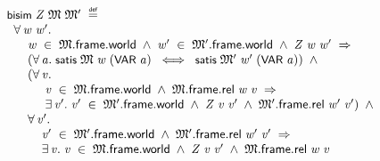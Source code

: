 \documentclass[letterpaper]{article}
\renewcommand{\HOLConst}[1]{{\textsf{\upshape\small #1}}}
\newenvironment{holmath}{\begin{displaymath}\begin{array}{l}}{\end{array}\end{displaymath}\ignorespacesafterend}
\begin{document}
\begin{holmath}
  \HOLConst{bisim}\;\HOLFreeVar{Z}\;\HOLFreeVar{\ensuremath{\mathfrak{M}}}\;\HOLFreeVar{\ensuremath{\mathfrak{M}'}}\;\HOLSymConst{\HOLTokenDefEquality{}}\\
\;\;\HOLSymConst{\HOLTokenForall{}}\HOLBoundVar{w}\;\HOLBoundVar{w\sp{\prime}}.\\
\;\;\;\;\;\;\HOLBoundVar{w}\;\HOLSymConst{\HOLTokenIn{}}\;\HOLFreeVar{\ensuremath{\mathfrak{M}}}.\HOLFieldName{frame}.\HOLFieldName{world}\;\HOLSymConst{\HOLTokenConj{}}\;\HOLBoundVar{w\sp{\prime}}\;\HOLSymConst{\HOLTokenIn{}}\;\HOLFreeVar{\ensuremath{\mathfrak{M}'}}.\HOLFieldName{frame}.\HOLFieldName{world}\;\HOLSymConst{\HOLTokenConj{}}\;\HOLFreeVar{Z}\;\HOLBoundVar{w}\;\HOLBoundVar{w\sp{\prime}}\;\HOLSymConst{\HOLTokenImp{}}\\
\;\;\;\;\;\;(\HOLSymConst{\HOLTokenForall{}}\HOLBoundVar{a}.\;\HOLConst{satis}\;\HOLFreeVar{\ensuremath{\mathfrak{M}}}\;\HOLBoundVar{w}\;(\HOLConst{VAR}\;\HOLBoundVar{a})\;\HOLSymConst{\HOLTokenEquiv{}}\;\HOLConst{satis}\;\HOLFreeVar{\ensuremath{\mathfrak{M}'}}\;\HOLBoundVar{w\sp{\prime}}\;(\HOLConst{VAR}\;\HOLBoundVar{a}))\;\HOLSymConst{\HOLTokenConj{}}\\
\;\;\;\;\;\;(\HOLSymConst{\HOLTokenForall{}}\HOLBoundVar{v}.\\
\;\;\;\;\;\;\;\;\;\;\;\HOLBoundVar{v}\;\HOLSymConst{\HOLTokenIn{}}\;\HOLFreeVar{\ensuremath{\mathfrak{M}}}.\HOLFieldName{frame}.\HOLFieldName{world}\;\HOLSymConst{\HOLTokenConj{}}\;\HOLFreeVar{\ensuremath{\mathfrak{M}}}.\HOLFieldName{frame}.\HOLFieldName{rel}\;\HOLBoundVar{w}\;\HOLBoundVar{v}\;\HOLSymConst{\HOLTokenImp{}}\\
\;\;\;\;\;\;\;\;\;\;\;\HOLSymConst{\HOLTokenExists{}}\HOLBoundVar{v\sp{\prime}}.\;\HOLBoundVar{v\sp{\prime}}\;\HOLSymConst{\HOLTokenIn{}}\;\HOLFreeVar{\ensuremath{\mathfrak{M}'}}.\HOLFieldName{frame}.\HOLFieldName{world}\;\HOLSymConst{\HOLTokenConj{}}\;\HOLFreeVar{Z}\;\HOLBoundVar{v}\;\HOLBoundVar{v\sp{\prime}}\;\HOLSymConst{\HOLTokenConj{}}\;\HOLFreeVar{\ensuremath{\mathfrak{M}'}}.\HOLFieldName{frame}.\HOLFieldName{rel}\;\HOLBoundVar{w\sp{\prime}}\;\HOLBoundVar{v\sp{\prime}})\;\HOLSymConst{\HOLTokenConj{}}\\
\;\;\;\;\;\;\HOLSymConst{\HOLTokenForall{}}\HOLBoundVar{v\sp{\prime}}.\\
\;\;\;\;\;\;\;\;\;\;\HOLBoundVar{v\sp{\prime}}\;\HOLSymConst{\HOLTokenIn{}}\;\HOLFreeVar{\ensuremath{\mathfrak{M}'}}.\HOLFieldName{frame}.\HOLFieldName{world}\;\HOLSymConst{\HOLTokenConj{}}\;\HOLFreeVar{\ensuremath{\mathfrak{M}'}}.\HOLFieldName{frame}.\HOLFieldName{rel}\;\HOLBoundVar{w\sp{\prime}}\;\HOLBoundVar{v\sp{\prime}}\;\HOLSymConst{\HOLTokenImp{}}\\
\;\;\;\;\;\;\;\;\;\;\HOLSymConst{\HOLTokenExists{}}\HOLBoundVar{v}.\;\HOLBoundVar{v}\;\HOLSymConst{\HOLTokenIn{}}\;\HOLFreeVar{\ensuremath{\mathfrak{M}}}.\HOLFieldName{frame}.\HOLFieldName{world}\;\HOLSymConst{\HOLTokenConj{}}\;\HOLFreeVar{Z}\;\HOLBoundVar{v}\;\HOLBoundVar{v\sp{\prime}}\;\HOLSymConst{\HOLTokenConj{}}\;\HOLFreeVar{\ensuremath{\mathfrak{M}}}.\HOLFieldName{frame}.\HOLFieldName{rel}\;\HOLBoundVar{w}\;\HOLBoundVar{v}
\end{holmath}
\end{document}

